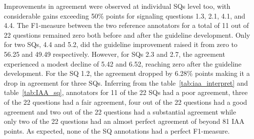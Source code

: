 \documentclass[sn-mathphys,Numbered]{sn-jnl}%
\theoremstyle{thmstyleone}%
\theoremstyle{thmstyletwo}%
\theoremstyle{thmstylethree}%
\begin{document}
Improvements in agreement were observed at individual SQs level too, with considerable gains exceeding 50\% points for signaling questions 1.3, 2.1, 4.1, and 4.4.
The F1-measure between the two reference annotators for a total of 11 out of 22 questions remained zero both before and after the guideline development.
Only for two SQs, 4.4 and 5.2, did the guideline improvement raised it from zero to 56.25 and 49.49 respectively.
However, for SQs 2.3 and 2.7, the agreement experienced a modest decline of 5.42 and 6.52, reaching zero after the guideline development.
For the SQ 1.2, the agreement dropped by 6.28\% points making it a drop in agreement for three SQs.
Inferring from the table~\ref{tab:iaa_interpret} and table~\ref{tab:IAA_sq}, annotators for 11 of the 22 SQs had a poor agreement, three of the 22 questions had a fair agreement, four out of the 22 questions had a good agreement and two out of the 22 questions had a substantial agreement while only two of the 22 questions had an almost perfect agreement of beyond 81 IAA points.
As expected, none of the SQ annotations had a perfect F1-measure.
%
%
%
\end{document}
